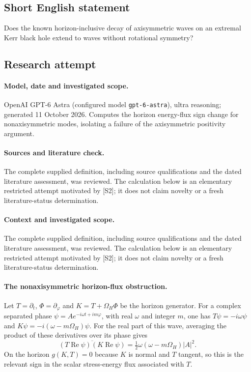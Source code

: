 \documentclass[11pt]{article}
\begin{document}
\subsection{Short English statement}
Does the known horizon-inclusive decay of axisymmetric waves on an extremal Kerr black hole extend to waves without rotational symmetry?
\subsection{Research attempt}
\paragraph{Model, date and investigated scope.}
OpenAI GPT-6 Astra (configured model \texttt{gpt-6-astra}), ultra reasoning; generated 11 October 2026. Computes the horizon energy-flux sign change for nonaxisymmetric modes, isolating a failure of the axisymmetric positivity argument.

\paragraph{Sources and literature check.}
The complete supplied definition, including source qualifications and the dated literature assessment, was reviewed. The calculation below is an elementary restricted attempt motivated by [S2]; it does not claim novelty or a fresh literature-status determination.

\paragraph{Context and investigated scope.} The complete supplied definition, including source qualifications and the dated literature assessment, was reviewed. The calculation below is an elementary restricted attempt motivated by [S2]; it does not claim novelty or a fresh literature-status determination.

\paragraph{The nonaxisymmetric horizon-flux obstruction.} Let $T=\partial_t$, $\Phi=\partial_\varphi$ and $K=T+\Omega_H\Phi$ be the horizon generator. For a complex separated phase $\psi=Ae^{-i\omega t+im\varphi}$, with real $\omega$ and integer $m$, one has $T\psi=-i\omega\psi$ and $K\psi=-i(\omega-m\Omega_H)\psi$. For the real part of this wave, averaging the product of these derivatives over its phase gives
\[
 \overline{(T\operatorname{Re}\psi)(K\operatorname{Re}\psi)}
 =\tfrac12\omega(\omega-m\Omega_H)|A|^2.
\]
On the horizon $g(K,T)=0$ because $K$ is normal and $T$ tangent, so this is the relevant sign in the scalar stress-energy flux associated with $T$.
\end{document}
